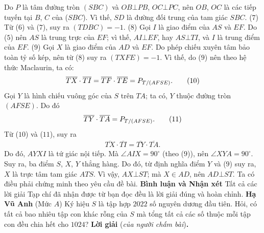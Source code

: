 \begin{multicols}{2}
	\vskip 0.05cm
	Do $P$ là tâm đường tròn $(SBC)$ và $OB \bot PB$, $OC \bot PC$, nên $OB$, $OC$ là các tiếp tuyến tại $B$, $C$ của ($SBC$). Vì thế, $SD$ là đường đối trung của tam giác $SBC$. \hfill ($7$)
	\vskip 0.05cm
	Từ ($6$) và ($7$), suy ra  $\left( {TDBC} \right) =  - 1.$           \hfill ($8$)
	\vskip 0.05cm
	Gọi $I$ là giao điểm của $AS$ và $EF$. Do ($5$) nên $AS$ là trung trực của $EF$; vì thế,  $AI \bot EF$, hay $AS \bot TI$, và $I$ là trung điểm của $EF$. \hfill ($9$)
	\vskip 0.05cm
	Gọi $X$ là giao điểm của $AD$ và $EF$.
	\vskip 0.05cm
	Do phép chiếu xuyên tâm bảo toàn tỷ số kép, nên từ ($8$) suy ra $\left( {TXFE} \right) =  - 1$.  Vì thế, do ($9$) nên theo hệ thức Maclaurin, ta có:
	\begin{align*}
		\overline {TX}  \cdot \overline {TI}  = \overline {TF}  \cdot \overline {TE}  = {P_{{T \mathord{\left/
						{\vphantom {T {\left( {AFSE} \right)}}} \right.
						\kern-\nulldelimiterspace} {\left( {AFSE} \right)}}}}.\tag{$10$}
	\end{align*}
	Gọi $Y$ là hình chiếu vuông góc của $S$ trên $TA$; ta có, $Y$ thuộc đường tròn $(AFSE)$. Do đó
	\begin{align*}
		\overline {TY}  \cdot \overline {TA}  = {P_{{T \mathord{\left/
						{\vphantom {T {\left( {AFSE} \right)}}} \right.
						\kern-\nulldelimiterspace} {\left( {AFSE} \right)}}}}. \tag{$11$}
	\end{align*}
	Từ ($10$) và ($11$), suy ra
	\begin{align*}
		\overline {TX}  \cdot \overline {TI}  = \overline {TY}  \cdot \overline {TA} .
	\end{align*}
	Do đó, $AYXI$ là tứ giác nội tiếp. Mà $\angle AIX = {90^{\circ}}$  (theo ($9$)), nên $\angle XYA = {90^{\circ}}$.  Suy ra, ba điểm $S$, $X$, $Y$ thẳng hàng. Do đó, từ định nghĩa điểm $Y$ và ($9$) suy ra, $X$ là trực tâm tam giác $ATS$. Vì vậy, $AX \bot ST$; mà $X \in AD$, nên $AD \bot ST$.
	\vskip 0.05cm
	Ta có điều phải chứng minh theo yêu cầu đề bài.
	\vskip 0.05cm
	\textbf{\color{thachthuctoanhoc}Bình luận và Nhận xét}
	\vskip 0.05cm
	Tất cả các lời giải Tạp chí đã nhận được từ bạn đọc đều là lời giải đúng và hoàn chỉnh.
	\vskip 0.05cm
	\hfill	\textbf{\color{thachthuctoanhoc}Hạ Vũ Anh}
	\vskip 0.05cm
	{}
	(Mức $A$) Ký hiệu $S$ là tập hợp $2022$ số nguyên dương đầu tiên. Hỏi, có tất cả bao nhiêu tập con khác rỗng của $S$ mà tổng tất cả các số thuộc mỗi tập con đều chia hết cho $1024$?
	\vskip 0.05cm
	\textbf{\color{thachthuctoanhoc}Lời giải} (\textit{của người chấm bài})\textbf{\color{thachthuctoanhoc}.}

\end{multicols}
